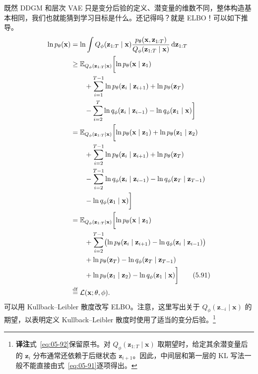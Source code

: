 既然 DDGM 和层次 VAE 只是变分后验的定义、潜变量的维数不同，整体构造基本相同，我们也就能猜到学习目标是什么。还记得吗？就是 ELBO！可以如下推导。
\begin{align}
\ln p_\theta(\mathbf{x})
 &=\ln\int Q_\phi(\mathbf{z}_{1:T}\mid\mathbf{x})
    \frac{p_\theta(\mathbf{x},\mathbf{z}_{1:T})}{Q_\phi(\mathbf{z}_{1:T}\mid\mathbf{x})}
    \,\mathrm{d}\mathbf{z}_{1:T}\notag\\
 &\geq\mathbb{E}_{Q_\phi(\mathbf{z}_{1:T}\mid\mathbf{x})}
   \biggl[\ln p_\theta(\mathbf{x}\mid\mathbf{z}_1)\notag\\
 &\qquad+\sum_{i=1}^{T-1}\ln p_\theta(\mathbf{z}_i\mid\mathbf{z}_{i+1})
             +\ln p_\theta(\mathbf{z}_T)\notag\\
 &\qquad-\sum_{i=2}^T\ln q_\phi(\mathbf{z}_i\mid\mathbf{z}_{i-1})
             -\ln q_\phi(\mathbf{z}_1\mid\mathbf{x})\biggr]\notag\\
 &=\mathbb{E}_{Q_\phi(\mathbf{z}_{1:T}\mid\mathbf{x})}
   \biggl[\ln p_\theta(\mathbf{x}\mid\mathbf{z}_1)
             +\ln p_\theta(\mathbf{z}_1\mid\mathbf{z}_2)\notag\\
 &\qquad+\sum_{i=2}^{T-1}\ln p_\theta(\mathbf{z}_i\mid\mathbf{z}_{i+1})
             +\ln p_\theta(\mathbf{z}_T)\notag\\
 &\qquad-\sum_{i=2}^{T-1}\ln q_\phi(\mathbf{z}_i\mid\mathbf{z}_{i-1})
             -\ln q_\phi(\mathbf{z}_T\mid\mathbf{z}_{T-1})\notag\\
 &\qquad-\ln q_\phi(\mathbf{z}_1\mid\mathbf{x})\biggr]\notag\\
 &=\mathbb{E}_{Q_\phi(\mathbf{z}_{1:T}\mid\mathbf{x})}\biggl[
   \ln p_\theta(\mathbf{x}\mid\mathbf{z}_1)\notag\\
 &\qquad+\sum_{i=2}^{T-1}
      \bigl(\ln p_\theta(\mathbf{z}_i\mid\mathbf{z}_{i+1})-\ln q_\phi(\mathbf{z}_i\mid\mathbf{z}_{i-1})\bigr)
      \notag\\
 &\qquad+\ln p_\theta(\mathbf{z}_T)-\ln q_\phi(\mathbf{z}_T\mid\mathbf{z}_{T-1})\notag\\
 &\qquad+\ln p_\theta(\mathbf{z}_1\mid\mathbf{z}_2)-\ln q_\phi(\mathbf{z}_1\mid\mathbf{x})\biggr]
   \tag{5.91}\label{eq:05-91}\\
 &\stackrel{\mathrm{df}}{=}\mathcal{L}(\mathbf{x};\theta,\phi). \notag
\end{align}
可以用 Kullback–Leibler 散度改写 ELBO。注意，这里写出关于 $Q_\phi(\mathbf{z}_{-i}\mid\mathbf{x})$ 的期望，以表明定义 Kullback–Leibler 散度时使用了适当的变分后验。\footnote{\textbf{译注}\quad 式~\eqref{eq:05-92}保留原书。对 $Q_\phi(\mathbf{z}_{1:T}\mid\mathbf{x})$ 取期望时，给定其余潜变量后的 $\mathbf{z}_i$ 分布通常还依赖于后继状态 $\mathbf{z}_{i+1}$。因此，中间层和第一层的 KL 写法一般不能直接由式~\eqref{eq:05-91}逐项得出。}
